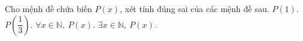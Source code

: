 \begin{ex}
Cho mệnh đề chứa biến $P(x)$, xét tính đúng sai của các mệnh đề sau.
\choiceTF
{$P(1)$.}
{$P\left(\dfrac13\right)$.}
{$\forall x\in\mathbb N,\ P(x)$.}
{$\exists x\in\mathbb N,\ P(x)$.}
\end{ex}
